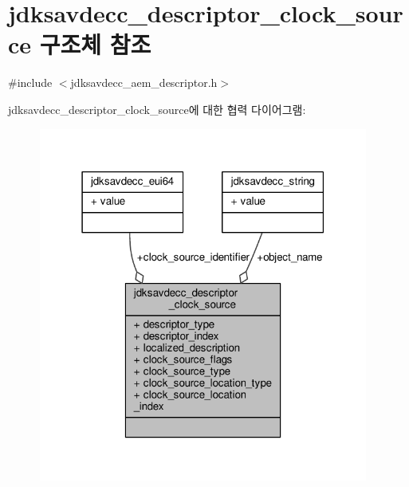 \hypertarget{structjdksavdecc__descriptor__clock__source}{}\section{jdksavdecc\+\_\+descriptor\+\_\+clock\+\_\+source 구조체 참조}
\label{structjdksavdecc__descriptor__clock__source}


{\ttfamily \#include $<$jdksavdecc\+\_\+aem\+\_\+descriptor.\+h$>$}



jdksavdecc\+\_\+descriptor\+\_\+clock\+\_\+source에 대한 협력 다이어그램\+:
\nopagebreak
\begin{figure}[H]
\begin{center}
\leavevmode
\includegraphics[width=307pt]{structjdksavdecc__descriptor__clock__source__coll__graph}
\end{center}
\end{figure}
